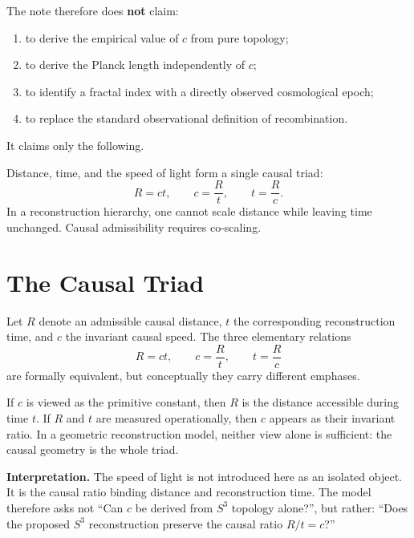 \documentclass[11pt,a4paper]{article}
\newcommand{\Sthree}{S^{3}}
\begin{document}
The note therefore does \textbf{not} claim:
\begin{enumerate}[leftmargin=2em, itemsep=3pt]
  \item to derive the empirical value of $c$ from pure topology;
  \item to derive the Planck length independently of $c$;
  \item to identify a fractal index with a directly observed cosmological epoch;
  \item to replace the standard observational definition of recombination.
\end{enumerate}

It claims only the following.

\begin{principlebox}
Distance, time, and the speed of light form a single causal triad:
\[
  R=ct,\qquad c=\frac{R}{t},\qquad t=\frac{R}{c}.
\]
In a reconstruction hierarchy, one cannot scale distance while leaving time unchanged.
Causal admissibility requires co-scaling.
\end{principlebox}

\section{The Causal Triad}

Let $R$ denote an admissible causal distance, $t$ the corresponding reconstruction
time, and $c$ the invariant causal speed.  The three elementary relations
\[
  R=ct,\qquad c=\frac{R}{t},\qquad t=\frac{R}{c}
\]
are formally equivalent, but conceptually they carry different emphases.

If $c$ is viewed as the primitive constant, then $R$ is the distance accessible during
time $t$.  If $R$ and $t$ are measured operationally, then $c$ appears as their invariant
ratio.  In a geometric reconstruction model, neither view alone is sufficient: the
causal geometry is the whole triad.

\begin{noteBox}
\textbf{Interpretation.}
The speed of light is not introduced here as an isolated object.  It is the causal
ratio binding distance and reconstruction time.  The model therefore asks not
``Can $c$ be derived from $\Sthree$ topology alone?'', but rather:
``Does the proposed $\Sthree$ reconstruction preserve the causal ratio $R/t=c$?''
\end{noteBox}
\end{document}
